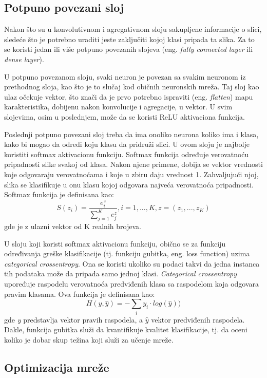 \documentclass[a4paper]{article}
\begin{document}
\subsection{Potpuno povezani sloj}
\label{potpuno_povezani_sloj}

Nakon što su u konvolutivnom i agregativnom sloju sakupljene informacije o slici, sledeće što je potrebno uraditi jeste zaključiti kojoj klasi pripada ta slika. Za to se koristi jedan ili više potpuno povezanih slojeva (eng. \textit{fully connected layer} ili \textit{dense layer}). 

U potpuno povezanom sloju, svaki neuron je povezan sa svakim neuronom iz prethodnog sloja, kao što je to slučaj kod običnih neuronskih mreža. Taj sloj kao ulaz očekuje vektor, što znači da je prvo potrebno ispraviti (eng. \textit{flatten}) mapu karakteristika, dobijenu nakon konvolucije i agregacije, u vektor. U svim slojevima, osim u poslednjem, može da se koristi ReLU aktivaciona funkcija.

Poslednji potpuno povezani sloj treba da ima onoliko neurona koliko ima i klasa, kako bi mogao da odredi koju klasu da pridruži slici. U ovom sloju je najbolje koristiti softmax aktivacionu funkciju. Softmax funkcija određuje verovatnoću pripadnosti slike svakoj od klasa. Nakon njene primene, dobija se vektor vrednosti koje odgovaraju verovatnoćama i koje u zbiru daju vrednost 1. Zahvaljujući njoj, slika se klasifikuje u onu klasu kojoj odgovara najveća verovatnoća pripadnosti. Softmax funkcija je definisana kao: $$ S(z_i) = \frac{e^z_i}{\sum_{j=1}^{K}e^z_j},  i = 1,...,K,  z = (z_1,...,z_K) $$ gde je z ulazni vektor od K realnih brojeva. 

U sloju koji koristi softmax aktivacionu funkciju, obično se za funkciju određivanja greške klasifikacije (tj. funkciju gubitka, eng. loss function) uzima \textit{categorical crossentropy}. Ona se koristi ukoliko su podaci takvi da jedna instanca tih podataka može da pripada samo jednoj klasi. \textit{Categorical crossentropy} upoređuje raspodelu verovatnoća predviđenih klasa sa raspodelom koja odgovara pravim klasama. Ova funkcija je definisana kao:
$$ H(y, \hat{y}) = -\sum_{i} y_i\cdot log(\hat{y})) $$ gde \textit{y} predstavlja vektor pravih raspodela, a $\hat{y}$ vektor predviđenih raspodela. Dakle, funkcija gubitka služi da kvantifikuje kvalitet klasifikacije, tj. da oceni koliko je dobar skup težina koji služi za učenje mreže.

\subsection{Optimizacija mreže}
\label{optimizacija}
\end{document}
